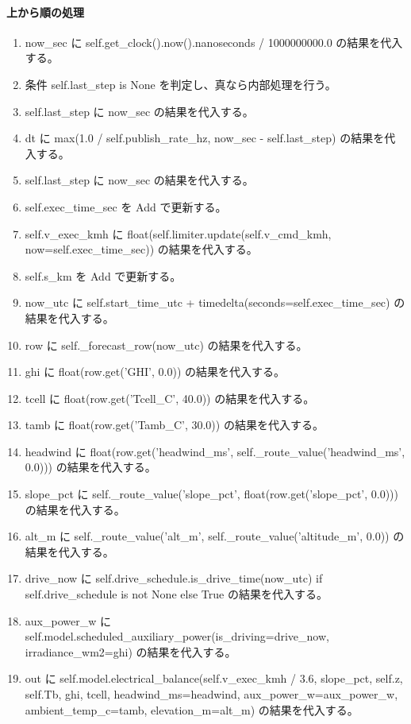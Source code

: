 \documentclass[a4paper,11pt]{article}
\begin{document}
            \paragraph{上から順の処理}
            \begin{enumerate}[leftmargin=1.8em]
            \item now\_sec に self.get\_clock().now().nanoseconds / 1000000000.0 の結果を代入する。
\item 条件 self.last\_step is None を判定し、真なら内部処理を行う。
\item   self.last\_step に now\_sec の結果を代入する。
\item dt に max(1.0 / self.publish\_rate\_hz, now\_sec - self.last\_step) の結果を代入する。
\item self.last\_step に now\_sec の結果を代入する。
\item self.exec\_time\_sec を Add で更新する。
\item self.v\_exec\_kmh に float(self.limiter.update(self.v\_cmd\_kmh, now=self.exec\_time\_sec)) の結果を代入する。
\item self.s\_km を Add で更新する。
\item now\_utc に self.start\_time\_utc + timedelta(seconds=self.exec\_time\_sec) の結果を代入する。
\item row に self.\_forecast\_row(now\_utc) の結果を代入する。
\item ghi に float(row.get('GHI', 0.0)) の結果を代入する。
\item tcell に float(row.get('Tcell\_C', 40.0)) の結果を代入する。
\item tamb に float(row.get('Tamb\_C', 30.0)) の結果を代入する。
\item headwind に float(row.get('headwind\_ms', self.\_route\_value('headwind\_ms', 0.0))) の結果を代入する。
\item slope\_pct に self.\_route\_value('slope\_pct', float(row.get('slope\_pct', 0.0))) の結果を代入する。
\item alt\_m に self.\_route\_value('alt\_m', self.\_route\_value('altitude\_m', 0.0)) の結果を代入する。
\item drive\_now に self.drive\_schedule.is\_drive\_time(now\_utc) if self.drive\_schedule is not None else True の結果を代入する。
\item aux\_power\_w に self.model.scheduled\_auxiliary\_power(is\_driving=drive\_now, irradiance\_wm2=ghi) の結果を代入する。
\item out に self.model.electrical\_balance(self.v\_exec\_kmh / 3.6, slope\_pct, self.z, self.Tb, ghi, tcell, headwind\_ms=headwind, aux\_power\_w=aux\_power\_w, ambient\_temp\_c=tamb, elevation\_m=alt\_m) の結果を代入する。

\end{enumerate}
\end{document}
